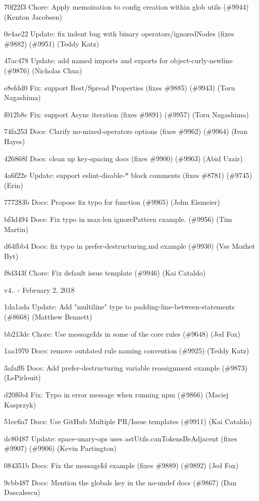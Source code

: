 \begin{DoxyItemize}
\item 70f22f3 Chore\+: Apply memoization to config creation within glob utils (\#9944) (Kenton Jacobsen)
\item 0e4ae22 Update\+: fix indent bug with binary operators/ignored\+Nodes (fixes \#9882) (\#9951) (Teddy Katz)
\item 47ac478 Update\+: add named imports and exports for object-\/curly-\/newline (\#9876) (Nicholas Chua)
\item e8efdd0 Fix\+: support Rest/\+Spread Properties (fixes \#9885) (\#9943) (Toru Nagashima)
\item f012b8c Fix\+: support Async iteration (fixes \#9891) (\#9957) (Toru Nagashima)
\item 74fa253 Docs\+: Clarify no-\/mixed-\/operators options (fixes \#9962) (\#9964) (Ivan Hayes)
\item 426868f Docs\+: clean up key-\/spacing docs (fixes \#9900) (\#9963) (Abid Uzair)
\item 4a6f22e Update\+: support eslint-\/disable-\/\texorpdfstring{$\ast$}{*} block comments (fixes \#8781) (\#9745) (Erin)
\item 777283b Docs\+: Propose fix typo for function (\#9965) (John Eismeier)
\item bf3d494 Docs\+: Fix typo in max-\/len ignore\+Pattern example. (\#9956) (Tim Martin)
\item d64fbb4 Docs\+: fix typo in prefer-\/destructuring.\+md example (\#9930) (Vse Mozhet Byt)
\item f8d343f Chore\+: Fix default issue template (\#9946) (Kai Cataldo)
\end{DoxyItemize}

v4.. -\/ February 2, 2018


\begin{DoxyItemize}
\item 1da1ada Update\+: Add "{}multiline"{} type to padding-\/line-\/between-\/statements (\#8668) (Matthew Bennett)
\item bb213dc Chore\+: Use message\+Ids in some of the core rules (\#9648) (Jed Fox)
\item 1aa1970 Docs\+: remove outdated rule naming convention (\#9925) (Teddy Katz)
\item 3afaff6 Docs\+: Add prefer-\/destructuring variable reassignment example (\#9873) (Le\+Pirlouit)
\item d20f6b4 Fix\+: Typo in error message when running npm (\#9866) (Maciej Kasprzyk)
\item 51ec6a7 Docs\+: Use Git\+Hub Multiple PR/\+Issue templates (\#9911) (Kai Cataldo)
\item dc80487 Update\+: space-\/unary-\/ops uses ast\+Utils.\+can\+Tokens\+Be\+Adjacent (fixes \#9907) (\#9906) (Kevin Partington)
\item 084351b Docs\+: Fix the message\+Id example (fixes \#9889) (\#9892) (Jed Fox)
\item 9cbb487 Docs\+: Mention the {\ttfamily globals} key in the no-\/undef docs (\#9867) (Dan Dascalescu)
\end{DoxyItemize}

